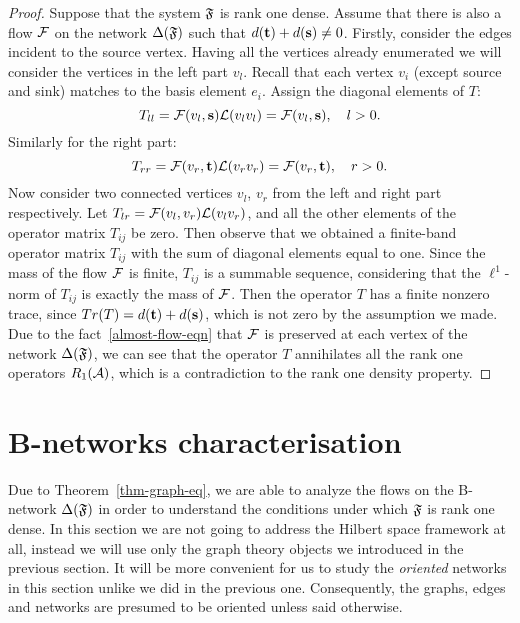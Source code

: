 \documentclass[12pt,oneside,a4paper]{amsart}
\begin{document}
\begin{proof}
        Suppose that the system $\fsys$ is rank one dense.
        Assume that there is also a flow $\flow$ on the network $\net(\fsys)$ such that $d(\sink) + d(\source) \neq 0$.
        Firstly, consider the edges incident to the source vertex.
        Having all the vertices already enumerated we will consider the vertices in the left part $v_{l}$.
        Recall that each vertex $v_i$ (except source and sink) matches to the basis element $e_i$.
        Assign the diagonal elements of $T$:
        \[
          T_{ll} = \flow(v_l, \source) \len(v_l v_l) = \flow(v_l, \source), \quad l > 0.
        \]
        Similarly for the right part:
        \[
          T_{rr} = \flow(v_r, \sink) \len(v_r v_r) = \flow(v_r, \sink), \quad r > 0.
        \]
        Now consider two connected vertices $v_l$, $v_r$ from the left and right part respectively.
        Let $T_{lr} = \flow(v_l, v_r) \len(v_l  v_r)$,
        and all the other elements of the operator matrix $T_{ij}$ be zero.
        Then observe that we obtained a finite-band operator matrix $T_{ij}$ with the sum of diagonal elements equal to one.
        Since the mass of the flow $\flow$ is finite, $T_{ij}$ is a summable sequence, considering that
          the $\ell^1$-norm of $T_{ij}$ is exactly the mass of $\flow$.
        Then the operator $T$ has a finite nonzero trace, since $Tr(T) = d(\sink) + d(\source)$, which is not zero
          by the assumption we made.
        Due to the fact~\eqref{almost-flow-eqn} that $\flow$ is preserved at each vertex of the network $\net(\fsys)$,
          we can see that the operator $T$ annihilates all the rank one operators $R_1(\cal{A})$,
          which is a contradiction to the rank one density property.
      \end{proof}

  \bigskip
  \section{B-networks characterisation}
    \label{sec:char}
    Due to Theorem~\ref{thm-graph-eq}, we are able to analyze the flows on the B-network
      $\net(\fsys)$ in order to understand the conditions under which $\fsys$ is rank one dense.
    In this section we are not going to address the Hilbert space framework at all,
      instead we will use only the graph theory objects we introduced in the previous section.
    It will be more convenient for us to study the \emph{oriented} networks in this section unlike we
      did in the previous one.
    Consequently, the graphs, edges and networks are presumed to be oriented unless said otherwise.
\end{document}
